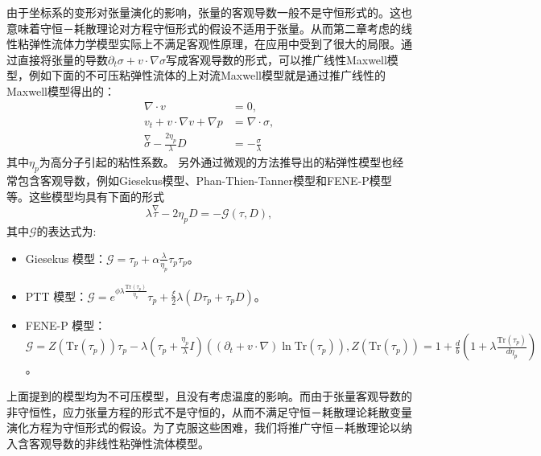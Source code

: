 由于坐标系的变形对张量演化的影响，张量的客观导数一般不是守恒形式的。这也意味着守恒－耗散理论对方程守恒形式的假设不适用于张量。从而第二章考虑的线性粘弹性流体力学模型实际上不满足客观性原理，在应用中受到了很大的局限。通过直接将张量的导数$\partial_t \sigma  + v \cdot \nabla \sigma$写成客观导数的形式，可以推广线性Maxwell模型，例如下面的不可压粘弹性流体的上对流Maxwell模型就是通过推广线性的Maxwell模型得出的\cite{oldroyd1950formulation}：
\begin{subequations} \label{eq:UCM}
	\begin{align}
		\nabla \cdot v &= 0, \\
		v_t + v \cdot \nabla v + \nabla p  &= \nabla \cdot \sigma, \\
		\stackrel{\nabla} \sigma - \frac{2\eta_p}{\lambda} D &= - \frac{\sigma}{\lambda}
	\end{align}
\end{subequations}
其中$\eta_p$为高分子引起的粘性系数。
另外通过微观的方法推导出的粘弹性模型也经常包含客观导数，例如Giesekus模型、Phan-Thien-Tanner模型和FENE-P模型等。这些模型均具有下面的形式
\begin{equation*}
	\lambda \stackrel{\nabla} \tau  -2 \eta_p D = - \mathcal{G}(\tau,D),
\end{equation*}
其中$\mathcal{G}$的表达式为\cite{le2009multiscale}:
\begin{itemize}
\item Giesekus 模型：$\mathcal{G} = \tau_p + \alpha \frac{\lambda}{\eta_p} \tau_p\tau_p$。
\item PTT 模型：$\mathcal{G} = e^{\phi \lambda \frac{\mbox{Tr}(\tau_p)}{\eta_p}}\tau_p + \frac{\xi}{2} \lambda (D \tau_p + \tau_p D)$。
\item FENE-P 模型：$\mathcal{G}  = Z(\mbox{Tr}(\tau_p))\tau_p  -\lambda (\tau_p + \frac{\eta_p}{\lambda} I)\left( (\partial_t + v \cdot \nabla) \ln \mbox{Tr}(\tau_p) \right), Z(\mbox{Tr}(\tau_p)) = 1 + \frac{d}{b} (1+ \lambda \frac{\mbox{Tr}{(\tau_p)}}{d \eta_p})$。
\end{itemize}

上面提到的模型均为不可压模型，且没有考虑温度的影响。而由于张量客观导数的非守恒性，应力张量方程的形式不是守恒的，从而不满足守恒－耗散理论耗散变量演化方程为守恒形式的假设。为了克服这些困难，我们将推广守恒－耗散理论以纳入含客观导数的非线性粘弹性流体模型。

